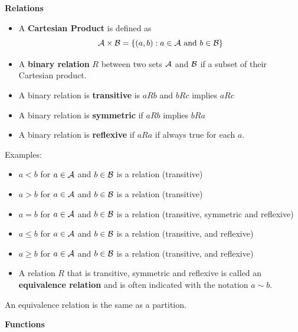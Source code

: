 \documentclass[justified,sixbynine]{tufte-book}
\def\subsubsection#1{{\bf #1}}
\theoremstyle{plain}%
\theoremstyle{definition}
\theoremstyle{remark}
\begin{document}
\begin{fullwidth}
\subsubsection{Relations}

\begin{itemize}
\item  A {\bf Cartesian Product} is defined as
\begin{equation}
{\cal A}\times {\cal B}=\{(a,b):a\in {\cal A}\text{ and }b\in {\cal B}\}
\end{equation}

\item  A {\bf binary relation} $R$ between two sets ${\cal A}$ and ${\cal B}$
if a subset of their Cartesian product.

\item  A binary relation is {\bf transitive} is $aRb$ and $bRc$ implies $aRc$

\item  A binary relation is {\bf symmetric} if $aRb$ implies $bRa$

\item  A binary relation is {\bf reflexive} if $aRa$ if always true for each
$a.$
\end{itemize}

Examples:

\begin{itemize}
\item
$a<b$ for $a\in {\cal A}$ and $b\in {\cal B}$ is a relation (transitive)
\item
$a>b$ for $a\in {\cal A}$ and $b\in {\cal B}$ is a relation (transitive)
\item
$a=b$ for $a\in {\cal A}$ and $b\in {\cal B}$ is a relation (transitive,
symmetric and reflexive)
\item
$a\leq b$ for $a\in {\cal A}$ and $b\in {\cal B}$ is a relation (transitive,
and reflexive)
\item
$a\geq b$ for $a\in {\cal A}$ and $b\in {\cal B}$ is a relation (transitive,
and reflexive)
\item  A relation $R$ that is transitive, symmetric and reflexive is called
an {\bf equivalence relation} and is often indicated with the notation $a\sim b$.
\end{itemize}

An equivalence relation is the same as a partition.

\subsubsection{Functions}


\end{fullwidth}
\end{document}
